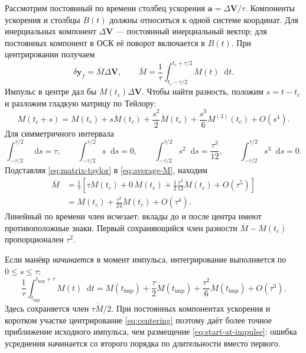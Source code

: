 \documentclass[a4paper,11pt]{article}
\newcommand{\dd}{\mathop{}\!\mathrm d}
\newcommand{\vect}[1]{\boldsymbol{#1}}
\numberwithin{equation}{section}
\begin{document}
Рассмотрим постоянный по времени столбец ускорения
$\vect a=\Delta\vect V/\tau$.
Компоненты ускорения и столбцы $B(t)$ должны относиться
к одной системе координат. Для инерциальных компонент
$\Delta\vect V$ --- постоянный инерциальный вектор;
для постоянных компонент в ОСК её поворот включается в $B(t)$.
При центрировании получаем
\begin{equation}
\delta\vect y_f=\overline M\Delta\vect V,\qquad
\overline M=\frac1\tau
\int_{t_c-\tau/2}^{t_c+\tau/2}M(t)\dd t.
\label{eq:average-M}
\end{equation}
Импульс в центре дал бы $M(t_c)\Delta\vect V$.
Чтобы найти разность, положим $s=t-t_c$ и разложим гладкую
матрицу по Тейлору:
\begin{equation}
M(t_c+s)=M(t_c)+s\dot M(t_c)
 +\frac{s^2}{2}\ddot M(t_c)
 +\frac{s^3}{6}M^{(3)}(t_c)+O(s^4).
\label{eq:matrix-taylor}
\end{equation}
Для симметричного интервала
\[
\int_{-\tau/2}^{\tau/2}\dd s=\tau,\qquad
\int_{-\tau/2}^{\tau/2}s\dd s=0,\qquad
\int_{-\tau/2}^{\tau/2}s^2\dd s=\frac{\tau^3}{12},\qquad
\int_{-\tau/2}^{\tau/2}s^3\dd s=0.
\]
Подставляя \eqref{eq:matrix-taylor} в \eqref{eq:average-M}, находим
\begin{equation}
\begin{aligned}
\overline M
&=\frac1\tau\left[
 \tau M(t_c)+0\,\dot M(t_c)
 +\frac12\frac{\tau^3}{12}\ddot M(t_c)
 +O(\tau^5)\right]\\
&=M(t_c)+\frac{\tau^2}{24}\ddot M(t_c)+O(\tau^4).
\end{aligned}
\label{eq:midpoint-error}
\end{equation}
Линейный по времени член исчезает: вклады до и после центра
имеют противоположные знаки. Первый сохраняющийся член
разности $\overline M-M(t_c)$ пропорционален $\tau^2$.

Если манёвр \emph{начинается} в момент импульса, интегрирование
выполняется по $0\leqslant s\leqslant\tau$:
\begin{equation}
\frac1\tau\int_{t_{\mathrm{imp}}}^{t_{\mathrm{imp}}+\tau}M(t)\dd t
=M(t_{\mathrm{imp}})
 +\frac\tau2\dot M(t_{\mathrm{imp}})
 +\frac{\tau^2}{6}\ddot M(t_{\mathrm{imp}})+O(\tau^3).
\label{eq:start-error}
\end{equation}
Здесь сохраняется член $\tau\dot M/2$.
При постоянных компонентах ускорения и коротком участке
центрирование \eqref{eq:centering} поэтому даёт более точное
приближение исходного импульса, чем размещение
\eqref{eq:start-at-impulse}: ошибка усреднения начинается
со второго порядка по длительности вместо первого.
\end{document}

